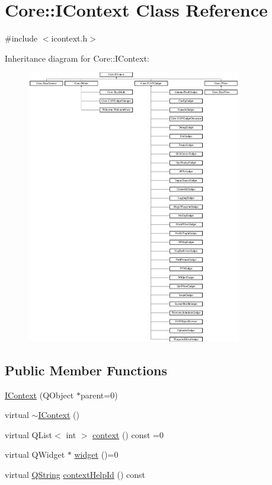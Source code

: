 \hypertarget{class_core_1_1_i_context}{\section{\-Core\-:\-:\-I\-Context \-Class \-Reference}
\label{class_core_1_1_i_context}
}


{\ttfamily \#include $<$icontext.\-h$>$}

\-Inheritance diagram for \-Core\-:\-:\-I\-Context\-:\begin{figure}[H]
\begin{center}
\leavevmode
\includegraphics[height=12.000000cm]{class_core_1_1_i_context}
\end{center}
\end{figure}
\subsection*{\-Public \-Member \-Functions}
\begin{DoxyCompactItemize}
\item 
\hyperlink{group___core_plugin_gaefe1feaabd7322bdc75a29867232b62d}{\-I\-Context} (\-Q\-Object $\ast$parent=0)
\item 
virtual \hyperlink{group___core_plugin_ga06db5255221724686bbd8a6de4be036f}{$\sim$\-I\-Context} ()
\item 
virtual \-Q\-List$<$ int $>$ \hyperlink{group___core_plugin_ga1256e28e719a9a981f779a0c77b59a7e}{context} () const =0
\item 
virtual \-Q\-Widget $\ast$ \hyperlink{group___core_plugin_gafa470639238652ef10e435b6c28d9282}{widget} ()=0
\item 
virtual \hyperlink{group___u_a_v_objects_plugin_gab9d252f49c333c94a72f97ce3105a32d}{\-Q\-String} \hyperlink{group___core_plugin_ga5997b2db2d4557802b5b8a8006790abf}{context\-Help\-Id} () const 
\end{DoxyCompactItemize}


